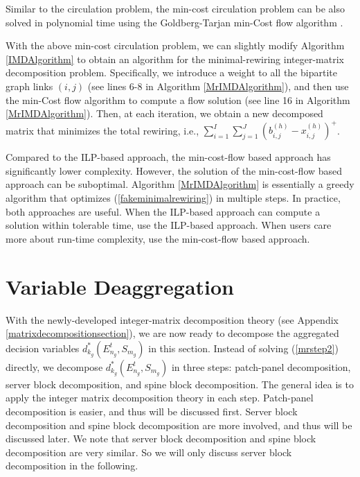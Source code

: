 \documentclass[letterpaper,twocolumn,10pt]{article}
\begin{document}
Similar to the circulation problem, the min-cost circulation problem can be also solved in polynomial time using the Goldberg-Tarjan min-Cost flow algorithm \cite{MinCostFlowImplementation}.

With the above min-cost circulation problem, we can slightly modify Algorithm \ref{IMDAlgorithm} to obtain an algorithm for the minimal-rewiring integer-matrix decomposition problem. Specifically, we introduce a weight to all the bipartite graph links $(i, j)$ (see lines 6-8 in Algorithm \ref{MrIMDAlgorithm}), and then use the min-Cost flow algorithm to compute a flow solution (see line 16 in Algorithm \ref{MrIMDAlgorithm}). Then, at each iteration, we obtain a new decomposed matrix that minimizes the total rewiring, i.e., $\sum_{i=1}^I\sum_{j=1}^J(b_{i,j}^{(h)} - x_{i,j}^{(h)})^+$.

Compared to the ILP-based approach, the min-cost-flow based approach has significantly lower complexity. However, the solution of the min-cost-flow based approach can be suboptimal. Algorithm \ref{MrIMDAlgorithm} is essentially a greedy algorithm that optimizes (\ref{fakeminimalrewiring}) in multiple steps. In practice, both approaches are useful. When the ILP-based approach can compute a solution within tolerable time, use the ILP-based approach. When users care more about run-time complexity, use the min-cost-flow based approach.

\section{Variable Deaggregation}\label{decompositionsection}
With the newly-developed integer-matrix decomposition theory (see Appendix \ref{matrixdecompositionsection}), we are now ready to decompose the aggregated decision variables $d^*_{k_g}(E_{n_g}^t, S_{m_g})$ in this section. Instead of solving (\ref{mrstep2}) directly, we decompose $d^*_{k_g}(E_{n_g}^t, S_{m_g})$ in three steps: patch-panel decomposition, server block decomposition, and spine block decomposition. The general idea is to apply the integer matrix decomposition theory in each step.  Patch-panel decomposition is easier, and thus will be discussed first. Server block decomposition and spine block decomposition are more involved, and thus will be discussed later. We note that server block decomposition and spine block decomposition are very similar. So we will only discuss server block decomposition in the following.
\end{document}

